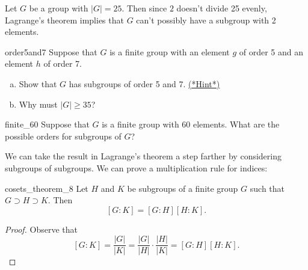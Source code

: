 \begin{example}{}
Let $G$ be a group with $|G|=25$.  Then since $2$ doesn't divide 25 evenly, Lagrange's theorem implies that $G$ can't possibly have a subgroup with 2 elements.
\end{example}

\begin{exercise}{order5and7}
Suppose that $G$ is a finite group with an element $g$ of order 5 and an element $h$ of order 7. 
\begin{enumerate}[(a)]
\item
Show that $G$ has subgroups of order 5 and 7. \hyperref[sec:Cosets:Hints]{(*Hint*)}
\item
Why must $|G| \geq 35$?
\end{enumerate}
\end{exercise} 

\begin{exercise}{finite_60}
Suppose that $G$ is a finite group with 60 elements.  What are the possible orders for subgroups of $G$?
\end{exercise}


We can take the result in Lagrange's theorem a step farther by considering  subgroups of subgroups. We can prove a multiplication rule for indices:

\begin{prop}{cosets_theorem_8}
Let $H$ and $K$ be subgroups of a finite group $G$ such that $G \supset H \supset K$.  Then 
\[
[G:K] = [G:H][H:K].
\]
\end{prop}
 
\begin{proof}
Observe that
\[
[G:K] = \frac{|G|}{|K|} = \frac{|G|}{|H|} \cdot
\frac{|H|}{|K|} = [G:H][H:K].
\]
\end{proof}

